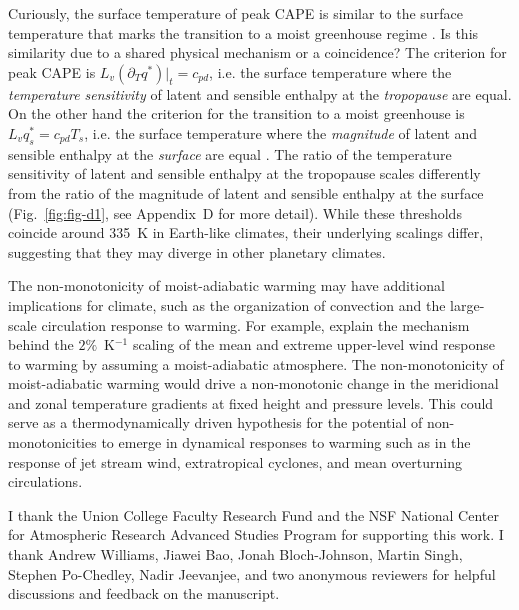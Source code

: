 \documentclass[draft]{ametsocV6.1}
\begin{document}
Curiously, the surface temperature of peak CAPE \citep[$\approx335$~K,][]{romps2016} is similar to the surface temperature that marks the transition to a moist greenhouse regime \citep[$\approx335$~K,][]{komabayasi1967, ingersoll1969, kasting1988}. Is this similarity due to a shared physical mechanism or a coincidence? The criterion for peak CAPE is $L_v(\partial_T q^*)|_t=c_{pd}$, i.e. the surface temperature where the \textit{temperature sensitivity} of latent and sensible enthalpy at the \textit{tropopause} are equal. On the other hand the criterion for the transition to a moist greenhouse is $L_vq_s^* = c_{pd}T_s$, i.e. the surface temperature where the \textit{magnitude} of latent and sensible enthalpy at the \textit{surface} are equal \citep{wordsworth2013}. The ratio of the temperature sensitivity of latent and sensible enthalpy at the tropopause scales differently from the ratio of the magnitude of latent and sensible enthalpy at the surface (Fig.~\ref{fig:fig-d1}, see Appendix~D for more detail). While these thresholds coincide around 335~K in Earth-like climates, their underlying scalings differ, suggesting that they may diverge in other planetary climates.

The non-monotonicity of moist-adiabatic warming may have additional implications for climate, such as the organization of convection and the large-scale circulation response to warming. For example, \cite{shaw2025a}  explain the mechanism behind the $2\%$~K$^{-1}$ scaling of the mean and extreme upper-level wind response to warming by assuming a moist-adiabatic atmosphere. The non-monotonicity of moist-adiabatic warming would drive a non-monotonic change in the meridional and zonal temperature gradients at fixed height and pressure levels. This could serve as a thermodynamically driven hypothesis for the potential of non-monotonicities to emerge in dynamical responses to warming such as in the response of jet stream wind, extratropical cyclones, and mean overturning circulations.

\acknowledgments
I thank the Union College Faculty Research Fund and the NSF National Center for Atmospheric Research Advanced Studies Program for supporting this work. I thank Andrew Williams, Jiawei Bao, Jonah Bloch-Johnson, Martin Singh, Stephen Po-Chedley, Nadir Jeevanjee, and two anonymous reviewers for helpful discussions and feedback on the manuscript.
\end{document}
